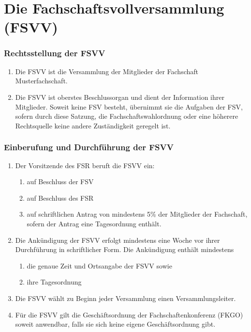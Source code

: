 \documentclass{article}
\newcommand{\fachschaft}{Musterfachschaft}
\begin{document}
\part{Die Fachschaftsvollversammlung (FSVV)}
\section{Rechtsstellung der FSVV}
\begin{enumerate}[(1)]
    \item Die FSVV ist die Versammlung der Mitglieder der Fachschaft \fachschaft.
    \item Die FSVV ist oberstes Beschlussorgan und dient der Information ihrer Mitglieder. Soweit keine FSV besteht, übernimmt sie die Aufgaben der FSV, sofern durch diese Satzung, die Fachschaftswahlordnung oder eine höherere Rechtsquelle keine andere Zuständigkeit geregelt ist.
\end{enumerate}

\section{Einberufung und Durchführung der FSVV}
\begin{enumerate}[(1)]
	\item Der Vorsitzende des FSR beruft die FSVV ein:
	\begin{enumerate}[1.]
		\item auf Beschluss der FSV
		\item auf Beschluss des FSR
		\item auf schriftlichen Antrag von mindestens 5\% der Mitglieder der Fachschaft, sofern der Antrag eine Tagesordnung enthält.
	\end{enumerate}
	\item Die Ankündigung der FSVV erfolgt mindestens eine Woche vor ihrer Durchführung in schriftlicher Form. Die Ankündigung enthält mindestens
	\begin{enumerate}[1.]
		\item die genaue Zeit und Ortsangabe der FSVV sowie
		\item ihre Tagesordnung
	\end{enumerate}
	\item Die FSVV wählt zu Beginn jeder Versammlung einen Versammlungsleiter.
	\item Für die FSVV gilt die Geschäftsordnung der Fachschaftenkonferenz (FKGO) soweit anwendbar, falls sie sich keine eigene Geschäftsordnung gibt.
\end{enumerate}
\end{document}
